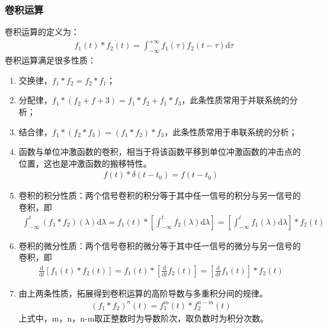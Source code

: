 \documentclass{hitreport}
\begin{document}
\subsubsection{卷积运算}
卷积运算的定义为：
\begin{align}
f_{1}\left(t\right) \ast f_{2}\left(t\right) = \int_{-\infty}^{+\infty}{f_{1}\left(\tau\right) f_{2}\left(t-\tau \right) \mathrm{d}\tau}
\end{align}
卷积运算满足很多性质：
\begin{enumerate}
\item 交换律，$f_1 \ast f_2 = f_2 \ast f_1$；
\item 分配律，$f_1 \ast \left(f_2+f+3\right) = f_1 \ast f_2+f_1 \ast f_3$，此条性质常用于并联系统的分析；
\item 结合律，$f_1 \ast \left(f_2 \ast f_3\right) = \left(f_1 \ast f_2\right)\ast f_3$，此条性质常用于串联系统的分析；
\item 函数与单位冲激函数的卷积，相当于将该函数平移到单位冲激函数的冲击点的位置，这也是冲激函数的搬移特性。
\begin{align}
f\left(t\right) \ast \delta \left(t-t_0\right) = f\left(t-t_0\right)
\end{align}

\item 卷积的积分性质：两个信号卷积的积分等于其中任一信号的积分与另一信号的卷积，即
\begin{align}
\int_{-\infty}^{t}{\left(f_1 \ast f_2\right)\left(\lambda\right)\mathrm{d}\lambda} = f_1\left(t\right) \ast \left[\int_{-\infty}^{t}f_2\left(\lambda\right)\mathrm{d}\lambda\right] =  \left[\int_{-\infty}^{t}f_1\left(\lambda\right)\mathrm{d}\lambda\right] \ast f_2\left(t\right)
\end{align}

\item 卷积的微分性质：两个信号卷积的微分等于其中任一信号的微分与另一信号的卷积，即
\begin{align}
\frac{\mathrm{d} }{\mathrm{d} t}{\left[f_1\left(t\right) \ast f_2\left(t\right)\right]} = f_1\left(t\right) \ast \left[\frac{\mathrm{d} }{\mathrm{d} t}f_2\left(t\right)\right] = \left[\frac{\mathrm{d} }{\mathrm{d} t}f_1\left(t\right)\right]\ast f_2\left(t\right)
\end{align}

\item 由上两条性质，拓展得到卷积运算的高阶导数与多重积分间的规律。
\begin{align}
\left(f_1 \ast f_2\right)^{n}\left(t\right) = f_1^{m}\left(t\right) \ast f_2^{n-m}\left(t\right)
\end{align}
上式中，m，n，n-m取正整数时为导数阶次，取负数时为积分次数。

\end{enumerate}
\end{document}

